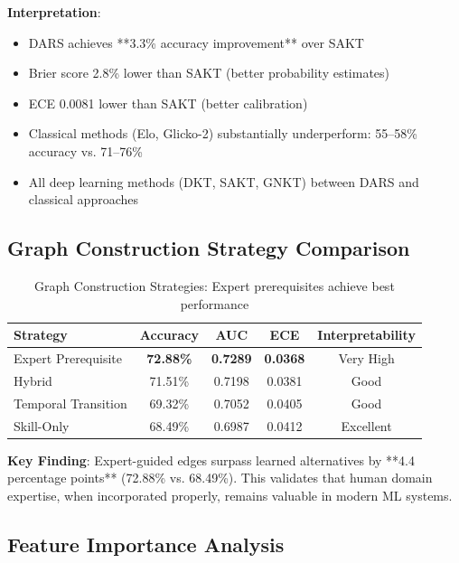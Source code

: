 \documentclass[conference]{IEEEtran}
\begin{document}
\textbf{Interpretation}:
\begin{itemize}
    \item DARS achieves **3.3\% accuracy improvement** over SAKT
    \item Brier score 2.8\% lower than SAKT (better probability estimates)
    \item ECE 0.0081 lower than SAKT (better calibration)
    \item Classical methods (Elo, Glicko-2) substantially underperform: 55--58\% accuracy vs. 71--76\%
    \item All deep learning methods (DKT, SAKT, GNKT) between DARS and classical approaches
\end{itemize}

\subsection{Graph Construction Strategy Comparison}

\begin{table}[h]
\centering
\small
\begin{tabular}{l|c|c|c|c}
\toprule
\textbf{Strategy} & \textbf{Accuracy} & \textbf{AUC} & \textbf{ECE} & \textbf{Interpretability} \\
\midrule
Expert Prerequisite & \textbf{72.88\%} & \textbf{0.7289} & \textbf{0.0368} & Very High \\
Hybrid & 71.51\% & 0.7198 & 0.0381 & Good \\
Temporal Transition & 69.32\% & 0.7052 & 0.0405 & Good \\
Skill-Only & 68.49\% & 0.6987 & 0.0412 & Excellent \\
\bottomrule
\end{tabular}
\caption{Graph Construction Strategies: Expert prerequisites achieve best performance}
\label{tab:graphs}
\end{table}

\textbf{Key Finding}: Expert-guided edges surpass learned alternatives by **4.4 percentage points** (72.88\% vs. 68.49\%). This validates that human domain expertise, when incorporated properly, remains valuable in modern ML systems.

\subsection{Feature Importance Analysis}
\end{document}
